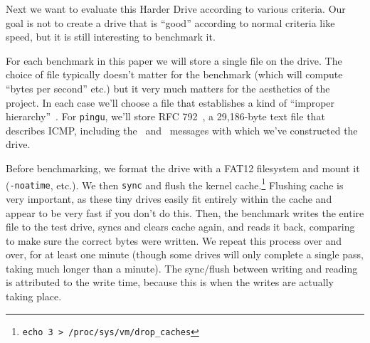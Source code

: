 \documentclass[twocolumn]{article}
\begin{document}
Next we want to evaluate this Harder Drive according to various
criteria. Our goal is not to create a drive that is ``good'' according
to normal criteria like speed, but it is still interesting to benchmark
it.

For each benchmark in this paper we will store a single file on the
drive. The choice of file typically doesn't matter for the benchmark
(which will compute ``bytes per second'' etc.) but it very much
matters for the aesthetics of the project. In each case we'll choose a
file that establishes a kind of ``improper
hierarchy''~\cite{murphy2018improper}. For {\tt pingu}, we'll store
RFC 792~\cite{rfc792}, a 29,186-byte text file that describes ICMP,
including the \icmpecho\ and \icmpechoreply\ messages with which we've
constructed the drive.

Before benchmarking, we format the drive with a FAT12 filesystem and
mount it ({\tt -noatime}, etc.). We then {\tt sync} and flush the
kernel cache.\footnote{ \verb+echo 3 > /proc/sys/vm/drop_caches+ }
Flushing cache is very important, as these tiny drives easily fit
entirely within the cache and appear to be very fast if you don't do
this. Then, the benchmark writes the entire file to the test drive,
syncs and clears cache again, and reads it back, comparing to make
sure the correct bytes were written. We repeat this process over and
over, for at least one minute (though some drives will only complete a
single pass, taking much longer than a minute). The sync/flush between
writing and reading is attributed to the write time, because this is
when the writes are actually taking place.





\end{document}
